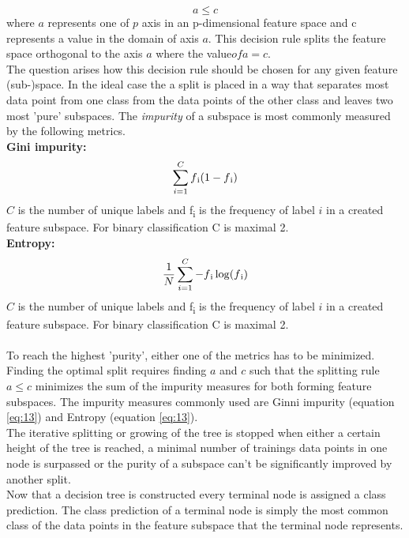 \begin{equation} \label{eq:12}
a \leq c
\end{equation}
where $a$ represents one of $p$ axis in an p-dimensional feature space and c represents a value in the domain of axis $a$.
This decision rule splits the feature space orthogonal to the axis $a$ where the value$ of a = c$.
\\
The question arises how this decision rule should be chosen for any given feature (sub-)space.
In the ideal case the a split is placed in a way that separates most data point from one class from the data points of the other class and leaves two most 'pure' subspaces. The \emph{impurity} of a subspace is most commonly measured by the following metrics. 
\\
\textbf{Gini impurity:}  \\
\begin{equation} \label{eq:13}
\sum_{i=1}^{C} f\textsubscript{i}(1-f\textsubscript{i})
\end{equation}
$C$ is the number of unique labels and f\textsubscript{i} is the frequency of label $i$ in a created feature subspace. For binary classification C is maximal 2.\\
\textbf{Entropy:}
\begin{equation} \label{eq:14}
\frac{1}{N}\sum_{i=1}^{C} -f\textsubscript{i}\log(f\textsubscript{i})
\end{equation}
$C$ is the number of unique labels and f\textsubscript{i} is the frequency of label $i$ in a created feature subspace. For binary classification C is maximal 2. \\
\\
To reach the highest 'purity', either one of the metrics has to be minimized. \\
Finding the optimal split requires finding $a$ and $c$ such that the splitting rule  $a \leq c$ minimizes the sum of the impurity measures for both forming feature subspaces. The impurity measures commonly used are Ginni impurity (equation \ref{eq:13}) and Entropy (equation \ref{eq:13}). 
\\
The iterative splitting or growing of the tree is stopped when either a certain height of the tree is reached, a minimal number of trainings data points in one node is surpassed or the purity of a subspace can't be significantly improved by another split.
\\

Now that a decision tree is constructed every terminal node is assigned a class prediction. The class prediction of a terminal node is simply the most common class of the data points in the feature subspace that the terminal node represents.
\\


